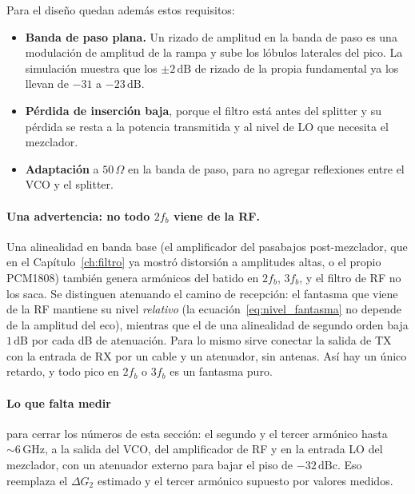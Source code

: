 \documentclass[12pt, a4paper, twoside]{report}
\begin{document}
Para el diseño quedan además estos requisitos:
\begin{itemize}
  \item \textbf{Banda de paso plana.} Un rizado de amplitud en la banda de
    paso es una modulación de amplitud de la rampa y sube los lóbulos
    laterales del pico. La simulación muestra que los $\pm 2\,\text{dB}$ de
    rizado de la propia fundamental ya los llevan de $-31$ a $-23\,\text{dB}$.
  \item \textbf{Pérdida de inserción baja}, porque el filtro está antes del
    splitter y su pérdida se resta a la potencia transmitida y al nivel de LO
    que necesita el mezclador.
  \item \textbf{Adaptación} a $50\,\Omega$ en la banda de paso, para no
    agregar reflexiones entre el VCO y el splitter.
\end{itemize}

\paragraph{Una advertencia: no todo $2f_b$ viene de la RF.} Una alinealidad
en banda base (el amplificador del pasabajos post-mezclador, que en el
Capítulo~\ref{ch:filtro} ya mostró distorsión a amplitudes altas, o el
propio PCM1808) también genera armónicos del batido en $2f_b$, $3f_b$, y el
filtro de RF no los saca. Se distinguen atenuando el camino de recepción:
el fantasma que viene de la RF mantiene su nivel \emph{relativo} (la
ecuación~\eqref{eq:nivel_fantasma} no depende de la amplitud del eco),
mientras que el de una alinealidad de segundo orden baja $1\,\text{dB}$ por
cada dB de atenuación. Para lo mismo sirve conectar la salida de TX con la
entrada de RX por un cable y un atenuador, sin antenas. Así hay un único
retardo, y todo pico en $2f_b$ o $3f_b$ es un fantasma puro.

\paragraph{Lo que falta medir} para cerrar los números de esta sección:
el segundo y el tercer armónico hasta $\sim\!6\,\text{GHz}$, a la salida del
VCO, del amplificador de RF y en la entrada LO del mezclador, con un
atenuador externo para bajar el piso de $-32\,\text{dBc}$. Eso reemplaza el
$\Delta G_2$ estimado y el tercer armónico supuesto por valores medidos.



\end{document}
